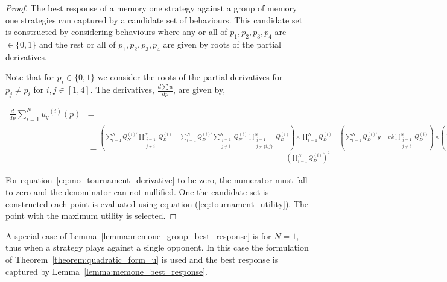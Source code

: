 \documentclass[10pt]{article}
\begin{document}
\begin{proof}
    The best response of a memory one strategy against a group of memory one
    strategies can captured by a candidate set of behaviours. This candidate set
    is constructed by considering behaviours where any or all of \(p_1, p_2,
    p_3, p_4\) are \(\in \{0, 1\}\) and the rest or all of \(p_1, p_2, p_3,
    p_4\) are given by roots of the partial derivatives.
    
    Note that for \(p_i \in
    \{0, 1\}\) we consider the roots of the partial derivatives for \(p_j \neq
    p_i\) for \(i,j \in [1, 4]\). The derivatives, \(\frac{d\sum u}{dp}\), are
    given by,

    {\scriptsize
    \begin{align}\label{eq:mo_tournament_derivative}
        \frac{d}{dp} \sum\limits_{i=1} ^ {N} {u_q}^{(i)} (p) & = \nonumber \\
        & =\frac{
        (\sum\limits_{i=1} ^ {N} Q_{N}^{(i)'} \prod_{\substack{j=1 \\ j \neq i}} ^ N Q_{D}^{(i)}
        + \sum\limits_{i=1} ^ {N} Q_{D}^{(i)'} \sum_{\substack{j=1 \\ j \neq i}} ^ {N} Q_{N}^{(i)}
       \prod_{\substack{j=1 \\ j \neq \{i, j\}}} ^ N Q_{D}^{(i)}) \times
       \prod\limits_{i=1} ^ N Q_{D}^{(i)} - (\sum\limits_{i=1} ^ {N} Q_{D}^{(i)'}y-vk
       \prod_{\substack{j=1 \\ j \neq i}} ^ N Q_{D}^{(i)}) \times
       (\sum\limits_{i=1} ^ {N} Q_{N}^{(i)} \prod_{\substack{j=1 \\ j \neq i}} ^ N Q_{D}^{(i)})}
        {(\prod\limits_{i=1} ^ N Q_{D}^{(i)})^{2}}
    \end{align}
    }

    For equation~\ref{eq:mo_tournament_derivative} to be zero, the numerator
    must fall to zero and the denominator can not nullified. One the candidate
    set is constructed each point is evaluated using equation
    (\ref{eq:tournament_utility}). The point with the maximum utility is
    selected.
\end{proof}

A special case of Lemma~\ref{lemma:memone_group_best_response} is for \(N=1\),
thus when a strategy plays against a single opponent. In this case the formulation
of Theorem~\ref{theorem:quadratic_form_u} is used and the best response is captured
by Lemma~\ref{lemma:memone_best_response}.
\end{document}
